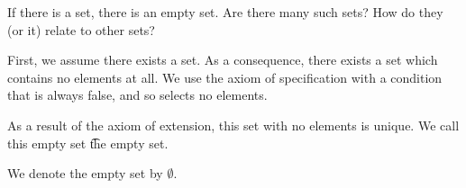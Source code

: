 
\sbasic








\sstart
{}


If there is a set, there is an empty set.
Are there many such sets?
How do they (or it) relate to other sets?


First, we assume there exists a set.
As a consequence, there exists a set which contains no elements at all.
We use the axiom of specification with a condition that is always false, and so selects no elements.

As a result of the axiom of extension, this set with no elements is unique.
We call this empty set \t{the empty set.}


We denote the empty set by $\emptyset$.
\strats
